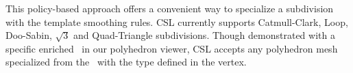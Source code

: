 This policy-based approach offers a convenient way to
specialize a subdivision with the template smoothing rules.
CSL currently supports Catmull-Clark, 
Loop, Doo-Sabin, $\sqrt{3}$ and Quad-Triangle
subdivisions. %
Though demonstrated with a specific enriched \poly\ in our 
polyhedron viewer, CSL accepts any polyhedron mesh specialized 
from the \poly\ with the  type defined in the vertex.  
